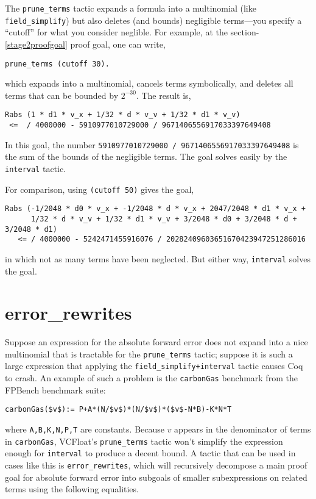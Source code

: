 \documentclass[article]{memoir}
\begin{document}
The \lstinline{prune_terms} tactic expands a formula into a
multinomial (like \lstinline{field_simplify}) but also
deletes (and bounds) negligible terms---you specify
a ``cutoff'' for what you consider neglible.  For example,
at the section-\ref{stage2proofgoal} proof goal,
one can write,

\begin{lstlisting}
prune_terms (cutoff 30).
\end{lstlisting}
which expands into a multinomial, cancels terms symbolically,
and deletes all terms that can be bounded by $2^{-30}$.
The result is,

\begin{lstlisting}
Rabs (1 * d1 * v_x + 1/32 * d * v_v + 1/32 * d1 * v_v)
 <=  / 4000000 - 5910977010729000 / 9671406556917033397649408
\end{lstlisting}
In this goal, the number \lstinline{5910977010729000 / 9671406556917033397649408} is the sum of the bounds of the negligible terms.
The goal solves easily by the \lstinline{interval} tactic.

For comparison, using \lstinline{(cutoff 50)} gives the goal,
\begin{lstlisting}
Rabs (-1/2048 * d0 * v_x + -1/2048 * d * v_x + 2047/2048 * d1 * v_x +
      1/32 * d * v_v + 1/32 * d1 * v_v + 3/2048 * d0 + 3/2048 * d + 3/2048 * d1)
   <= / 4000000 - 5242471455916076 / 20282409603651670423947251286016
\end{lstlisting}
in which not as many terms have been neglected.  But either way,
\lstinline{interval} solves the goal.

\chapter{error\_rewrites} Suppose an expression for the absolute
forward error does not expand into a nice multinomial
that is tractable for the \lstinline{prune_terms} tactic;
suppose it is such a large expression
that applying the \lstinline{field_simplify+interval} 
tactic causes Coq to crash. An example
of such a problem is the \lstinline{carbonGas} benchmark from the
FPBench benchmark suite:
\begin{lstlisting} 
carbonGas($v$):= P+A*(N/$v$)*(N/$v$)*($v$-N*B)-K*N*T
\end{lstlisting}
where \lstinline{A,B,K,N,P,T} are constants. Because $v$ 
appears in the denominator of terms in \lstinline{carbonGas},
VCFloat's \lstinline{prune_terms} tactic won't simplify the 
expression enough for \lstinline{interval} to produce a decent 
bound. A tactic that can be used in cases like this is 
\lstinline{error_rewrites}, which will recursively
decompose a main proof goal for absolute forward error into 
subgoals of smaller subexpressions on related terms using the 
following equalities.  
 
\end{document}
